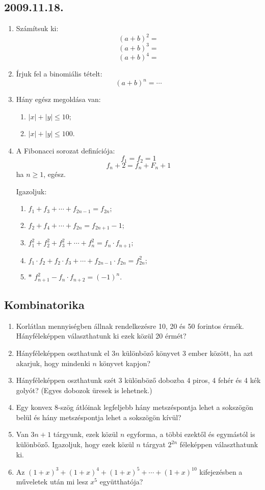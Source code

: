 \documentclass{article}
\newenvironment{abc}{\begin{enumerate}[label=\textit{\alph*})]}{\end{enumerate}}
\begin{document}
\subsection*{2009.11.18.}
\begin{enumerate}
\item Számítsuk ki: $$(a+b)^2=$$ $$(a+b)^3=$$ $$(a+b)^4=$$
\item Írjuk fel a binomiális tételt: $$(a+b)^n=\cdots$$
\item Hány egész megoldása van: 
\begin{abc}
\item $|x|+|y|\leq 10;$
\item $|x|+|y|\leq 100$.
\end{abc}
\item A Fibonacci sorozat definíciója: $$f_1=f_2=1$$ $$f_n+2=f_n+F_n+1$$ ha $n\geq 1$, egész.

Igazoljuk:
\begin{abc}
\item $f_1+f_3+\cdots +f_{2n-1}=f_{2n};$
\item $f_2+f_4+\cdots +f_{2n}=f_{2n+1}-1;$
\item $f_1^2+f_2^2+f_3^2+\cdots +f_n^2=f_n\cdot f_{n+1};$
\item $f_1\cdot f_2+f_2\cdot f_3+\cdots +f_{2n-1}\cdot f_{2n}=f_{2n}^2;$
\item $*$ $f_{n+1}^2-f_n\cdot f_{n+2}=(-1)^n$.
\end{abc}
\end{enumerate}

\subsection*{Kombinatorika}
\begin{enumerate}
\item Korlátlan mennyiségben állnak rendelkezésre 10, 20 és 50 forintos érmék. Hányféleképpen választhatunk ki ezek közül 20 érmét?
\item Hányféleképpen oszthatunk el $3n$ különböző könyvet 3 ember között, ha azt akarjuk, hogy mindenki $n$ könyvet kapjon?
\item Hányféleképpen oszthatunk szét 3 különböző dobozba 4 piros, 4 fehér és 4 kék golyót? (Egyes dobozok üresek is lehetnek.)
\item Egy konvex 8-szög átlóinak legfeljebb hány metszéspontja lehet a sokszögön belül és hány metszéspontja lehet a sokszögön kívül?
\item Van $3n+1$ tárgyunk, ezek közül $n$ egyforma, a többi ezektől és egymástól is különböző. Igazoljuk, hogy ezek közül $n$ tárgyat $2^{2n}$ féleképpen választhatunk ki.
\item Az $(1+x)^3+(1+x)^4+(1+x)^5+\cdots +(1+x)^{10}$ kifejezésben a műveletek után mi lesz $x^5$ együtthatója?
\end{enumerate}
\end{document}
